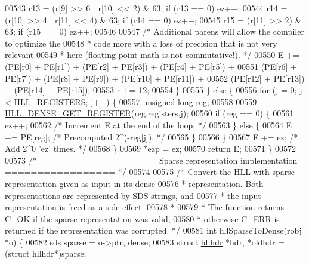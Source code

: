 \begin{DoxyCode}
{{00543             r13 = (r[9] >> 6 | r[10] << 2) & 63; \textcolor{keywordflow}{if} (r13 == 0) ez++;
00544             r14 = (r[10] >> 4 | r[11] << 4) & 63; \textcolor{keywordflow}{if} (r14 == 0) ez++;
00545             r15 = (r[11] >> 2) & 63; \textcolor{keywordflow}{if} (r15 == 0) ez++;
00546 
00547             \textcolor{comment}{/* Additional parens will allow the compiler to optimize the}
00548 \textcolor{comment}{             * code more with a loss of precision that is not very relevant}
00549 \textcolor{comment}{             * here (floating point math is not commutative!). */}
00550             E += (PE[r0] + PE[r1]) + (PE[r2] + PE[r3]) + (PE[r4] + PE[r5]) +
00551                  (PE[r6] + PE[r7]) + (PE[r8] + PE[r9]) + (PE[r10] + PE[r11]) +
00552                  (PE[r12] + PE[r13]) + (PE[r14] + PE[r15]);
00553             r += 12;
00554         \}
00555     \} \textcolor{keywordflow}{else} \{
00556         \textcolor{keywordflow}{for} (j = 0; j < \hyperlink{hyperloglog_8c_aa053beb90136828dcb46545c7445fc36}{HLL\_REGISTERS}; j++) \{
00557             \textcolor{keywordtype}{unsigned} \textcolor{keywordtype}{long} reg;
00558 
00559             \hyperlink{hyperloglog_8c_abace3387aeb1543c9bcbd0d9a62c7ebc}{HLL\_DENSE\_GET\_REGISTER}(reg,registers,j);
00560             \textcolor{keywordflow}{if} (reg == 0) \{
00561                 ez++;
00562                 \textcolor{comment}{/* Increment E at the end of the loop. */}
00563             \} \textcolor{keywordflow}{else} \{
00564                 E += PE[reg]; \textcolor{comment}{/* Precomputed 2^(-reg[j]). */}
00565             \}
00566         \}
00567         E += ez; \textcolor{comment}{/* Add 2^0 'ez' times. */}
00568     \}
00569     *ezp = ez;
00570     \textcolor{keywordflow}{return} E;
00571 \}
00572 
00573 \textcolor{comment}{/* ================== Sparse representation implementation  ================= */}
00574 
00575 \textcolor{comment}{/* Convert the HLL with sparse representation given as input in its dense}
00576 \textcolor{comment}{ * representation. Both representations are represented by SDS strings, and}
00577 \textcolor{comment}{ * the input representation is freed as a side effect.}
00578 \textcolor{comment}{ *}
00579 \textcolor{comment}{ * The function returns C\_OK if the sparse representation was valid,}
00580 \textcolor{comment}{ * otherwise C\_ERR is returned if the representation was corrupted. */}
00581 \textcolor{keywordtype}{int} hllSparseToDense(robj *o) \{
00582     sds sparse = o->ptr, dense;
00583     \textcolor{keyword}{struct} \hyperlink{structhllhdr}{hllhdr} *hdr, *oldhdr = (\textcolor{keyword}{struct} hllhdr*)sparse;
}}
\end{DoxyCode}
